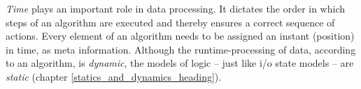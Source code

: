 \emph{Time} plays an important role in data processing. It dictates the order
in which steps of an algorithm are executed and thereby ensures a correct
sequence of actions. Every element of an algorithm needs to be assigned an
instant (position) in time, as meta information. Although the runtime-processing
of data, according to an algorithm, is \emph{dynamic}, the models of logic --
just like i/o state models -- are \emph{static} (chapter
\ref{statics_and_dynamics_heading}).
